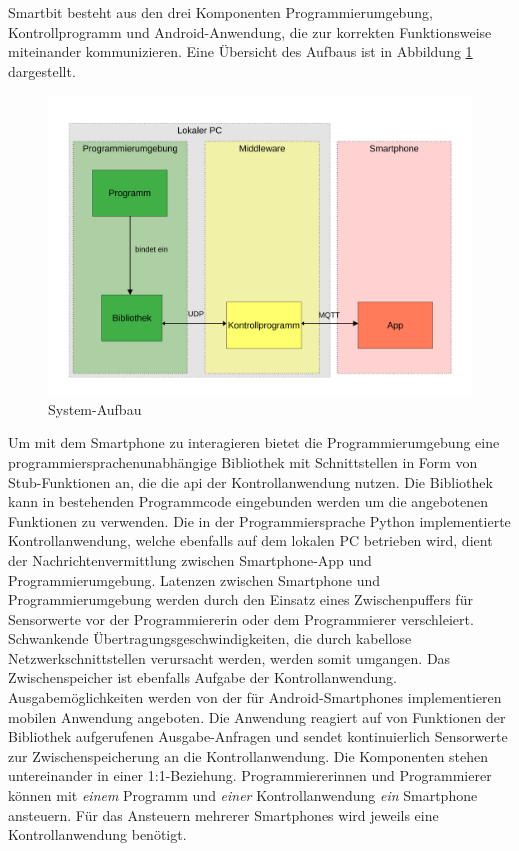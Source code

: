 \documentclass[11pt,a4paper]{report}
\begin{document}
Smartbit besteht aus den drei Komponenten Programmierumgebung, Kontrollprogramm und Android-Anwendung, die zur korrekten Funktionsweise miteinander kommunizieren.
Eine Übersicht des Aufbaus ist in Abbildung \ref{fig:design} dargestellt.
\begin{figure}[htbp]
\centering
\includegraphics[width=\textwidth]{images/framework.pdf}
\caption{System-Aufbau}
\label{fig:design}
\end{figure}
Um mit dem Smartphone zu interagieren bietet die Programmierumgebung eine programmiersprachenunabhängige Bibliothek mit Schnittstellen in Form von Stub-Funktionen an, die die \acrfull{api} der Kontrollanwendung nutzen.
Die Bibliothek kann in bestehenden Programmcode eingebunden werden um die angebotenen Funktionen zu verwenden.
Die in der Programmiersprache Python implementierte Kontrollanwendung, welche ebenfalls auf dem lokalen PC betrieben wird, dient der Nachrichtenvermittlung zwischen Smartphone-App und Programmierumgebung.
Latenzen zwischen Smartphone und Programmierumgebung werden durch den Einsatz eines Zwischenpuffers für Sensorwerte vor der Programmiererin oder dem Programmierer verschleiert.
Schwankende Übertragungsgeschwindigkeiten, die durch kabellose Netzwerkschnittstellen verursacht werden, werden somit umgangen.
Das Zwischenspeicher ist ebenfalls Aufgabe der Kontrollanwendung.
Ausgabemöglichkeiten werden von der für Android-Smartphones implementieren mobilen Anwendung angeboten.
Die Anwendung reagiert auf von Funktionen der Bibliothek aufgerufenen Ausgabe-Anfragen und sendet kontinuierlich Sensorwerte zur Zwischenspeicherung an die Kontrollanwendung.
Die Komponenten stehen untereinander in einer 1:1-Beziehung.
Programmiererinnen und Programmierer können mit \textit{einem} Programm und \textit{einer} Kontrollanwendung \textit{ein} Smartphone ansteuern.
Für das Ansteuern mehrerer Smartphones wird jeweils eine Kontrollanwendung benötigt.
\end{document}
